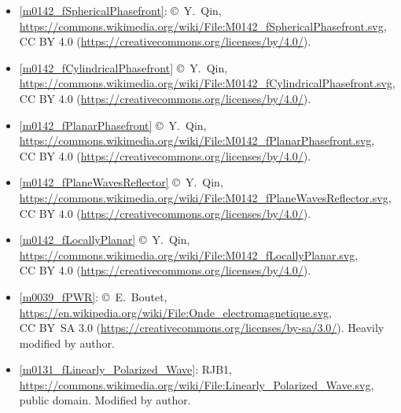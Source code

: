 \begin{itemize}

\item[Fig.] \label{m0142_fSphericalPhasefront_Credit}
  \ref{m0142_fSphericalPhasefront}:
  \copyright~Y.\ Qin, 
  \url{https://commons.wikimedia.org/wiki/File:M0142_fSphericalPhasefront.svg},\\ 
  CC BY 4.0 (\url{https://creativecommons.org/licenses/by/4.0/}).

\item[Fig.] \label{m0142_fCylindricalPhasefront_Credit}
  \ref{m0142_fCylindricalPhasefront}
  \copyright~Y.\ Qin, 
  \url{https://commons.wikimedia.org/wiki/File:M0142_fCylindricalPhasefront.svg},\\ 
  CC BY 4.0 (\url{https://creativecommons.org/licenses/by/4.0/}).

\item[Fig.] \label{m0142_fPlanarPhasefront_Credit}
  \ref{m0142_fPlanarPhasefront}
  \copyright~Y.\ Qin, 
  \url{https://commons.wikimedia.org/wiki/File:M0142_fPlanarPhasefront.svg},\\ 
  CC BY 4.0 (\url{https://creativecommons.org/licenses/by/4.0/}).

\item[Fig.] \label{m0142_fPlaneWavesReflector_Credit}
  \ref{m0142_fPlaneWavesReflector}
  \copyright~Y.\ Qin, 
  \url{https://commons.wikimedia.org/wiki/File:M0142_fPlaneWavesReflector.svg},\\ 
  CC BY 4.0 (\url{https://creativecommons.org/licenses/by/4.0/}).

\item[Fig.] \label{m0142_fLocallyPlanar_Credit}
  \ref{m0142_fLocallyPlanar}
  \copyright~Y.\ Qin, 
  \url{https://commons.wikimedia.org/wiki/File:M0142_fLocallyPlanar.svg},\\ 
  CC BY 4.0 (\url{https://creativecommons.org/licenses/by/4.0/}).

\item[Fig.] \label{m0039_Onde_electromagnetique_Credit}
  \ref{m0039_fPWR}:
  \copyright~E.\ Boutet, 
  {\footnotesize \url{https://en.wikipedia.org/wiki/File:Onde_electromagnetique.svg}},\\ 
  CC BY~SA 3.0 (\url{https://creativecommons.org/licenses/by-sa/3.0/}).
  Heavily modified by author.

\item[Fig.] \label{m0131_Linearly_Polarized_Wave_Credit}
  \ref{m0131_fLinearly_Polarized_Wave}:
  RJB1, 
  \url{https://commons.wikimedia.org/wiki/File:Linearly_Polarized_Wave.svg},\\ 
  public domain.
  Modified by author.


\end{itemize}
